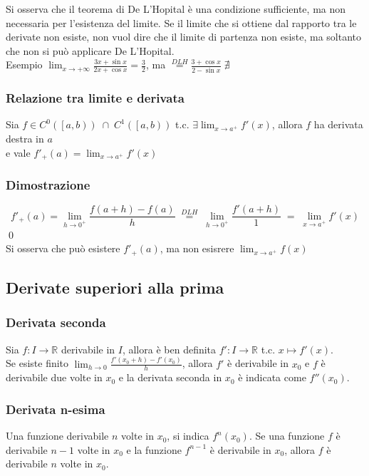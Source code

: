 \documentclass[a4paper]{article}
\newcommand\cont[2]{C^{#1} \left({#2}\right)}
\begin{document}
Si osserva che il teorema di De L'Hopital è una condizione sufficiente, ma non necessaria per l'esistenza del limite. Se il limite che si ottiene dal rapporto
tra le derivate non esiste, non vuol dire che il limite di partenza non esiste, ma soltanto che non si può applicare De L'Hopital. \\
Esempio \(\displaystyle \lim_{x \to + \infty} \frac{3x + \sin x}{2x + \cos x} = \frac{3}{2}\), ma \(\displaystyle \stackrel{DLH}{=} \frac{3 + \cos x}{2 - \sin x} \; \nexists\)

\newpage

\subsubsection*{Relazione tra limite e derivata}
Sia \(f \in \cont{0}{\left[a, b\right)} \; \cap \; \cont{1}{\left[a, b\right)}\) t.c. \(\exists \lim_{x \to a^+} f'(x)\), allora \(f\) ha derivata destra in \(a\) \\
e vale \(f'_+(a) = \lim_{x \to a^+} f'(x)\)

\subsubsection*{Dimostrazione}
\[f'_+(a) = \lim_{h \to 0^+} \frac{f(a + h) - f(a)}{h} \; \stackrel{DLH}{=} \; \lim_{h \to 0^+} \frac{f'(a + h)}{1} \; = \; \lim_{x \to a^+} f'(x)\]
\qed \\
Si osserva che può esistere \(f'_+(a)\), ma non esisrere \(\lim_{x \to a^+} f(x)\)

\subsection{Derivate superiori alla prima}
\subsubsection*{Derivata seconda}
Sia \(f:I \to \mathbb{R}\) derivabile in \(I\), allora è ben definita \(f':I \to \mathbb{R}\) t.c. \(x \mapsto f'(x)\). \\
Se esiste finito \(\displaystyle \lim_{h \to 0} \frac{f'(x_0 + h) - f'(x_0)}{h}\), allora \(f'\) è derivabile in \(x_0\)
e \(f\) è derivabile due volte in \(x_0\) e la derivata seconda in \(x_0\) è indicata come \(f''(x_0)\).

\subsubsection*{Derivata n-esima}
Una funzione derivabile \(n\) volte in \(x_0\), si indica \(f^n(x_0)\). Se una funzione \(f\) è derivabile \(n-1\) volte in \(x_0\)
e la funzione \(f^{n-1}\) è derivabile in \(x_0\), allora \(f\) è derivabile \(n\) volte in \(x_0\).
\end{document}
